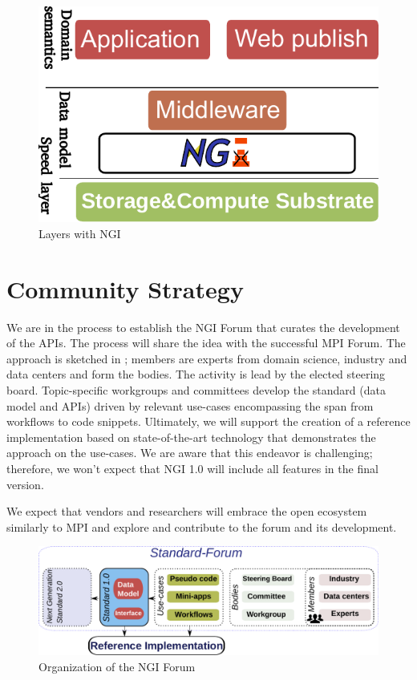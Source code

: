 \documentclass[a4paper, twocolumn]{article}
\begin{document}
\begin{figure}[b]
  \centering
  \includegraphics[width=0.75\columnwidth]{layers-ngi}
  \caption{Layers with NGI}
  \label{fig:ngilayers}
\end{figure}




\section{Community Strategy}

We are in the process to establish the NGI Forum that curates the development of the APIs.
The process will share the idea with the successful MPI Forum.
The approach is sketched in ;
members are experts from domain science, industry and data centers and form the bodies.
The activity is lead by the elected steering board.
Topic-specific workgroups and committees develop the standard (data model and APIs) driven by relevant use-cases encompassing the span from workflows to code snippets.
Ultimately, we will support the creation of a reference implementation based on state-of-the-art technology that demonstrates the approach on the use-cases.
We are aware that this endeavor is challenging; therefore, we won't expect that NGI 1.0 will include all features in the final version.

We expect that vendors and researchers will embrace the open ecosystem similarly to MPI and explore and contribute to the forum and its development.

\begin{figure}[b]
  \includegraphics[width=\columnwidth]{standardization}
  \caption{Organization of the NGI Forum}
  \label{fig:standardization}
\end{figure}
\end{document}
